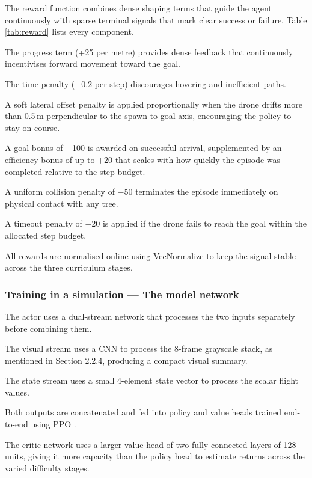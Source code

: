 \documentclass[../main.tex]{subfiles}
\begin{document}
The reward function combines dense shaping terms that guide the agent continuously with sparse terminal signals that mark clear success or failure. Table \ref{tab:reward} lists every component.

The progress term (+25 per metre) provides dense feedback that continuously incentivises forward movement toward the goal.

The time penalty ($-$0.2 per step) discourages hovering and inefficient paths.

A soft lateral offset penalty is applied proportionally when the drone drifts more than 0.5\,m perpendicular to the spawn-to-goal axis, encouraging the policy to stay on course.

A goal bonus of $+$100 is awarded on successful arrival, supplemented by an efficiency bonus of up to $+$20 that scales with how quickly the episode was completed relative to the step budget.

A uniform collision penalty of $-$50 terminates the episode immediately on physical contact with any tree.

A timeout penalty of $-$20 is applied if the drone fails to reach the goal within the allocated step budget.

All rewards are normalised online using VecNormalize to keep the signal stable across the three curriculum stages.



\subsubsection{Training in a simulation --- The model network}

The actor uses a dual-stream network that processes the two inputs separately before combining them.

The visual stream uses a CNN to process the 8-frame grayscale stack, as mentioned in Section 2.2.4, producing a compact visual summary.

The state stream uses a small 4-element state vector to process the scalar flight values.

Both outputs are concatenated and fed into policy and value heads trained end-to-end using PPO \cite{Schulman2017}.

The critic network uses a larger value head of two fully connected layers of 128 units, giving it more capacity than the policy head to estimate returns across the varied difficulty stages.
\end{document}
